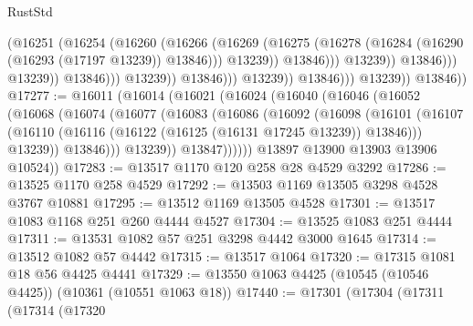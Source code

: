 \begin{lexlean}{RustStd}
\begin{coremodule}
                                                  (@16251
                                                    (@16254
                                                      (@16260
                                                        (@16266
                                                          (@16269
                                                            (@16275
                                                              (@16278
                                                                (@16284
                                                                  (@16290
                                                                    (@16293 (@17197 @13239))
                                                                    @13846)))
                                                              @13239))
                                                          @13846)))
                                                    @13239))
                                                @13846)))
                                          @13239))
                                      @13846)))
                                @13239))
                            @13846)))
                      @13239))
                  @13846)))
            @13239))
        @13846))
@17277 := @16011
    (@16014
      (@16021
        (@16024
          (@16040
            (@16046
              (@16052
                (@16068
                  (@16074
                    (@16077
                      (@16083
                        (@16086
                          (@16092
                            (@16098
                              (@16101
                                (@16107
                                  (@16110 (@16116 (@16122 (@16125 (@16131 @17245 @13239)) @13846)))
                                  @13239))
                              @13846)))
                        @13239))
                    @13847))))))
        @13897
        @13900
        @13903
        @13906
        @10524))
@17283 := @13517 @1170 @120 @258 @28 @4529 @3292
@17286 := @13525 @1170 @258 @4529
@17292 := @13503 @1169 @13505 @3298 @4528 @3767 @10881
@17295 := @13512 @1169 @13505 @4528
@17301 := @13517 @1083 @1168 @251 @260 @4444 @4527
@17304 := @13525 @1083 @251 @4444
@17311 := @13531 @1082 @57 @251 @3298 @4442 @3000 @1645
@17314 := @13512 @1082 @57 @4442
@17315 := @13517 @1064
@17320 := @17315 @1081 @18 @56 @4425 @4441
@17329 := @13550 @1063 @4425 (@10545 (@10546 @4425)) (@10361 (@10551 @1063 @18))
@17440 := @17301
    (@17304
      (@17311
        (@17314
          (@17320

\end{coremodule}
\end{lexlean}
